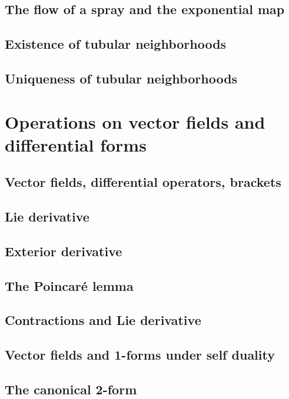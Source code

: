 \documentclass[a4paper]{article}
\begin{document}
\subsection{The flow of a spray and the exponential map}

\subsection{Existence of tubular neighborhoods}

\subsection{Uniqueness of tubular neighborhoods}

\section{Operations on vector fields and differential forms}

\subsection{Vector fields, differential operators, brackets}

\subsection{Lie derivative}

\subsection{Exterior derivative}

\subsection{The Poincar\'e lemma}

\subsection{Contractions and Lie derivative}

\subsection{Vector fields and 1-forms under self duality}

\subsection{The canonical 2-form}
\end{document}
